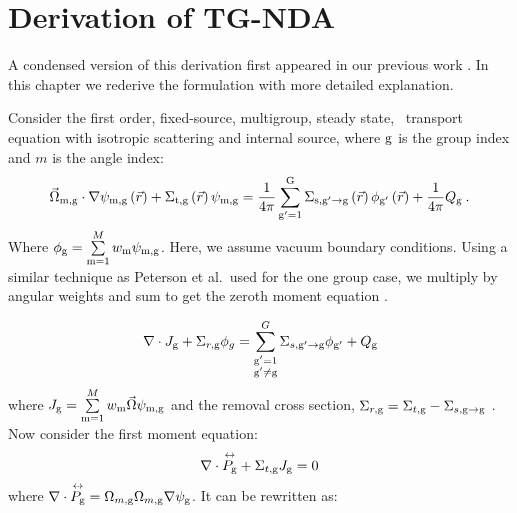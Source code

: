 
\section{Derivation of TG-NDA}
A condensed version of this derivation first appeared in our previous work \cite{Ramirez2017}. In this chapter we rederive the formulation with more detailed explanation.

Consider the first order, fixed-source, multigroup, steady state, \sn\ transport equation with isotropic scattering and internal source, where $\mathrm{g}$ is the group index and $m$ is the angle index:
  \begin{equation}
  \vec{\Omega}_{\mathrm{m},\mathrm{g}}\cdot \nabla \psi_{\mathrm{m},\mathrm{g}} \left(\vec{r}\right)+ \Sigma_{\mathrm{t},\mathrm{g}}\left(\vec{r}\right)\psi_{\mathrm{m},\mathrm{g}} = \frac{1}{4 \pi} \sum\limits_{\mathrm{g}'=1}^{\mathrm{G}} \Sigma_{\mathrm{s},{\mathrm{g}'}\to\mathrm{g}}\left(\vec{r}\right) \phi_{\mathrm{g}'}\left(\vec{r}\right) + \frac{1}{4 \pi} Q_{\mathrm{g}}\:.
  \end{equation}
  Where $\phi_{\mathrm{g}} = \sum\limits_{\mathrm{m}=1}^M w_{\mathrm{m}} \psi_{\mathrm{m}, \mathrm{g}}$. Here, we assume vacuum boundary conditions. Using a similar technique as Peterson et al.\ used for the one group case, we multiply by angular weights and sum to get the zeroth moment equation \cite{morel-holo}.

  \begin{equation}
  \nabla \cdot J_{\mathrm{g}} + \Sigma_{r,\mathrm{g}}\phi_g  = \sum_{\substack{\mathrm{g}'=1 \\ \mathrm{g}' \neq \mathrm{g}}}^G \Sigma_{s,\mathrm{g}' \rightarrow \mathrm{g}}\phi_{\mathrm{g}'} + Q_{\mathrm{g}}
  \label{eq:zeroth_moment}
  \end{equation}
where $J_{\mathrm{g}} = \sum\limits_{\mathrm{m}=1}^{M}w_{\mathrm{m}} \vec{\Omega}\psi_{\mathrm{m}, \mathrm{g}}$ and the removal cross section, $\Sigma_{r, \mathrm{g}} = \Sigma_{t, \mathrm{g}} - \Sigma_{s, \mathrm{g} \rightarrow \mathrm{g}}$ . 
  Now consider the first moment equation:
  \begin{equation}
  \nabla \cdot \overset{\text{\scriptsize$\leftrightarrow$}}{P_{\mathrm{g}}} + \Sigma_{t, \mathrm{g}} J_{\mathrm{g}} = 0
  \end{equation}
where $\nabla \cdot \overset{\text{\scriptsize$\leftrightarrow$}}{P_{\mathrm{g}}} =  \Omega_{m,\mathrm{g}} \Omega_{m,\mathrm{g}} \nabla \psi_{\mathrm{g}}$. It can be rewritten as: 


